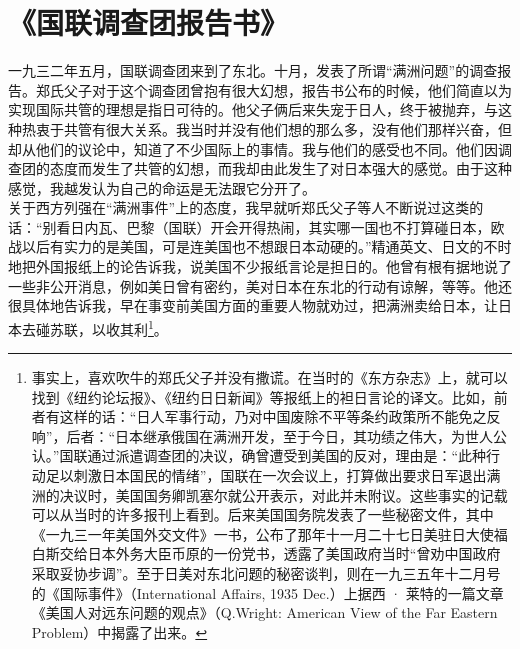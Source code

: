 \fancyhead[RO]{} %
\fancyhead[LE]{} %
\chapter*{《国联调查团报告书》}
\thispagestyle{empty}
一九三二年五月，国联调查团来到了东北。十月，发表了所谓“满洲问题”的调查报告。郑氏父子对于这个调查团曾抱有很大幻想，报告书公布的时候，他们简直以为实现国际共管的理想是指日可待的。他父子俩后来失宠于日人，终于被抛弃，与这种热衷于共管有很大关系。我当时并没有他们想的那么多，没有他们那样兴奋，但却从他们的议论中，知道了不少国际上的事情。我与他们的感受也不同。他们因调查团的态度而发生了共管的幻想，而我却由此发生了对日本强大的感觉。由于这种感觉，我越发认为自己的命运是无法跟它分开了。\\

关于西方列强在“满洲事件”上的态度，我早就听郑氏父子等人不断说过这类的话：“别看日内瓦、巴黎（国联）开会开得热闹，其实哪一国也不打算碰日本，欧战以后有实力的是美国，可是连美国也不想跟日本动硬的。”精通英文、日文的不时地把外国报纸上的论告诉我，说美国不少报纸言论是担日的。他曾有根有据地说了一些非公开消息，例如美日曾有密约，美对日本在东北的行动有谅解，等等。他还很具体地告诉我，早在事变前美国方面的重要人物就劝过，把满洲卖给日本，让日本去碰苏联，以收其利\footnote{事实上，喜欢吹牛的郑氏父子并没有撒谎。在当时的《东方杂志》上，就可以找到《纽约论坛报》、《纽约日日新闻》等报纸上的袒日言论的译文。比如，前者有这样的话：“日人军事行动，乃对中国废除不平等条约政策所不能免之反响”，后者：“日本继承俄国在满洲开发，至于今日，其功绩之伟大，为世人公认。”国联通过派遣调查团的决议，确曾遭受到美国的反对，理由是：“此种行动足以刺激日本国民的情绪”，国联在一次会议上，打算做出要求日军退出满洲的决议时，美国国务卿凯塞尔就公开表示，对此并未附议。这些事实的记载可以从当时的许多报刊上看到。后来美国国务院发表了一些秘密文件，其中《一九三一年美国外交文件》一书，公布了那年十一月二十七日美驻日大使福白斯交给日本外务大臣币原的一份党书，透露了美国政府当时“曾劝中国政府采取妥协步调”。至于日美对东北问题的秘密谈判，则在一九三五年十二月号的《国际事件》（International Affairs, 1935 Dec.）上据西 · 莱特的一篇文章《美国人对远东问题的观点》（Q.Wright: American View of the Far Eastern Problem）中揭露了出来。}。\\


